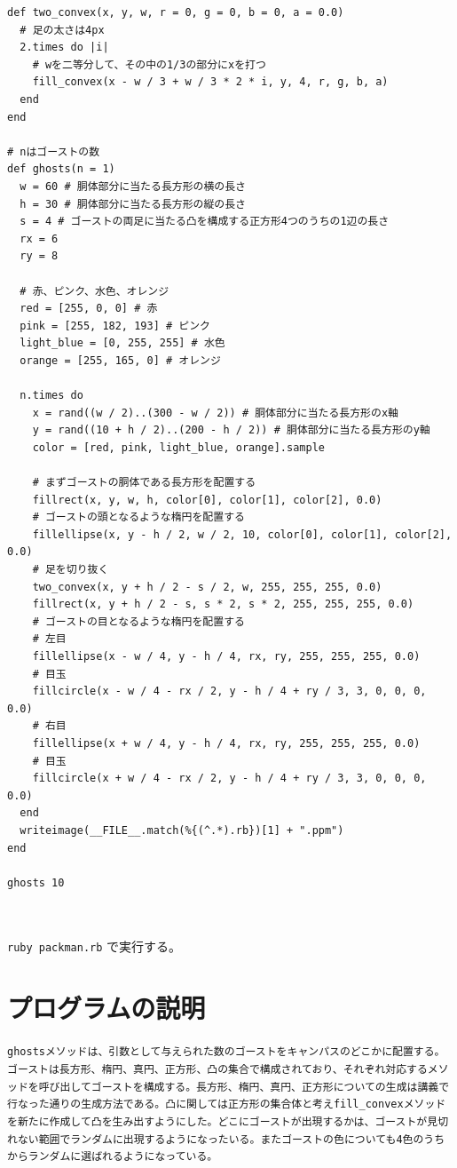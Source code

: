 \documentclass[12pt,a4j]{jarticle}
\begin{document}
\begin{verbatim}
def two_convex(x, y, w, r = 0, g = 0, b = 0, a = 0.0)
  # 足の太さは4px
  2.times do |i|
    # wを二等分して、その中の1/3の部分にxを打つ
    fill_convex(x - w / 3 + w / 3 * 2 * i, y, 4, r, g, b, a)
  end
end

# nはゴーストの数
def ghosts(n = 1)
  w = 60 # 胴体部分に当たる長方形の横の長さ
  h = 30 # 胴体部分に当たる長方形の縦の長さ
  s = 4 # ゴーストの両足に当たる凸を構成する正方形4つのうちの1辺の長さ
  rx = 6
  ry = 8

  # 赤、ピンク、水色、オレンジ
  red = [255, 0, 0] # 赤
  pink = [255, 182, 193] # ピンク
  light_blue = [0, 255, 255] # 水色
  orange = [255, 165, 0] # オレンジ

  n.times do
    x = rand((w / 2)..(300 - w / 2)) # 胴体部分に当たる長方形のx軸
    y = rand((10 + h / 2)..(200 - h / 2)) # 胴体部分に当たる長方形のy軸
    color = [red, pink, light_blue, orange].sample

    # まずゴーストの胴体である長方形を配置する
    fillrect(x, y, w, h, color[0], color[1], color[2], 0.0)
    # ゴーストの頭となるような楕円を配置する
    fillellipse(x, y - h / 2, w / 2, 10, color[0], color[1], color[2], 0.0)
    # 足を切り抜く
    two_convex(x, y + h / 2 - s / 2, w, 255, 255, 255, 0.0)
    fillrect(x, y + h / 2 - s, s * 2, s * 2, 255, 255, 255, 0.0)
    # ゴーストの目となるような楕円を配置する
    # 左目
    fillellipse(x - w / 4, y - h / 4, rx, ry, 255, 255, 255, 0.0)
    # 目玉
    fillcircle(x - w / 4 - rx / 2, y - h / 4 + ry / 3, 3, 0, 0, 0, 0.0)
    # 右目
    fillellipse(x + w / 4, y - h / 4, rx, ry, 255, 255, 255, 0.0)
    # 目玉
    fillcircle(x + w / 4 - rx / 2, y - h / 4 + ry / 3, 3, 0, 0, 0, 0.0)
  end
  writeimage(__FILE__.match(%{(^.*).rb})[1] + ".ppm")
end

ghosts 10



\end{verbatim}

\verb|ruby packman.rb| で実行する。

\section{プログラムの説明}

\verb|ghostsメソッドは、引数として与えられた数のゴーストをキャンパスのどこかに配置する。ゴーストは長方形、楕円、真円、正方形、凸の集合で構成されており、それぞれ対応するメソッドを呼び出してゴーストを構成する。長方形、楕円、真円、正方形についての生成は講義で行なった通りの生成方法である。凸に関しては正方形の集合体と考えfill_convexメソッドを新たに作成して凸を生み出すようにした。どこにゴーストが出現するかは、ゴーストが見切れない範囲でランダムに出現するようになったいる。またゴーストの色についても4色のうちからランダムに選ばれるようになっている。|
\end{document}

